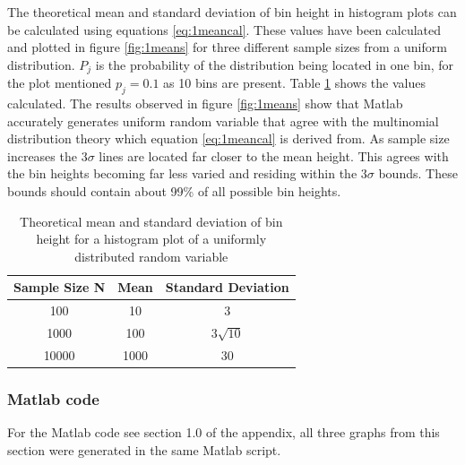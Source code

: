 \documentclass[twoside,twocolumn]{article}
\begin{document}
The theoretical mean and standard deviation of bin height in histogram plots can be calculated using equations \ref{eq:1meancal}. These values have been calculated and plotted in figure \ref{fig:1means} for three different sample sizes from a uniform distribution. $P_j$ is the probability of the distribution being located in one bin, for the plot mentioned $p_j = 0.1$ as 10 bins are present. Table \ref{table:tablemeans} shows the values calculated.
The results observed in figure \ref{fig:1means} show that Matlab accurately generates uniform random variable that agree with the multinomial distribution theory which equation \ref{eq:1meancal} is derived from. As sample size increases the $3\sigma$ lines are located far closer to the mean height. This agrees with the bin heights becoming far less varied and residing within the $3\sigma$ bounds. These bounds should contain about 99\% of all possible bin heights. 

\begin{table}[h]
\caption{Theoretical mean and standard deviation of bin height for a histogram plot of a uniformly distributed random variable}
\centering
\begin{tabular}{ c | c | c }
Sample Size N & Mean & Standard Deviation \\

\midrule
100 & 10 & 3  \\
1000 & 100 & $3\sqrt{10}$ \\
10000 & 1000 & 30 \\
\end{tabular}
\label{table:tablemeans}
\end{table}

\subsubsection{Matlab code}%
For the Matlab code see section 1.0 of the appendix, all three graphs from this section were generated in the same Matlab script.
\end{document}
